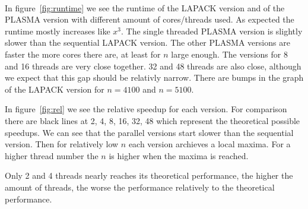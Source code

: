 \documentclass[a4paper,final,ngerman,english]{article}
\begin{document}
\ \\
In figure~\ref{fig:runtime}
we see the runtime of the LAPACK version and of the PLASMA version with different amount of cores/threads used.
As expected the runtime mostly increases like \(x^3\).
The single threaded PLASMA version is slightly slower than the sequential LAPACK version.
The other PLASMA versions are faster the more cores there are, at least for $n$ large enough.
The versions for 8 and 16 threads are very close together. 32 and 48 threads are also close, although
we expect that this gap should be relativly narrow.
There are bumps in the graph of the LAPACK version for \(n = 4100\) and \(n = 5100 \).

In figure~\ref{fig:rel}
we see the relative speedup for each version.
For comparison there are black lines at 2, 4, 8, 16, 32, 48 which represent the theoretical possible speedups.
We can see that the parallel versions start slower than the sequential version.
Then for relatively low $n$ each version archieves a local maxima.
For a higher thread number the $n$ is higher when the maxima is reached. 

Only 2 and 4 threads nearly reaches its theoretical performance, the higher the amount of threads,
the worse the performance relatively to the theoretical performance.
\end{document}
